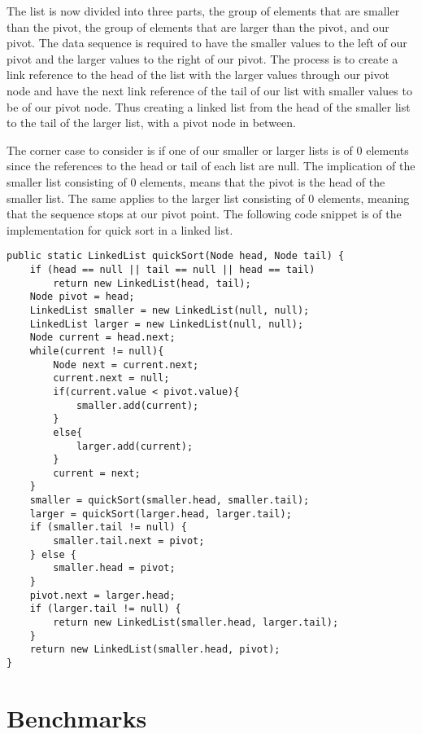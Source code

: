 \documentclass[a4paper,11pt]{article}
\begin{document}
        The list is now divided into three parts, the group of elements that are smaller than the pivot, the group of elements that are larger than the pivot, and our pivot. The data sequence is required to have the smaller values to the left of our pivot and the larger values to the right of our pivot. The process is to create a link reference to the head of the list with the larger values through our pivot node and have the next link reference of the tail of our list with smaller values to be of our pivot node. Thus creating a linked list from the head of the smaller list to the tail of the larger list, with a pivot node in between. 

        The corner case to consider is if one of our smaller or larger lists is of 0 elements since the references to the head or tail of each list are null. The implication of the smaller list consisting of 0 elements, means that the pivot is the head of the smaller list. The same applies to the larger list consisting of 0 elements, meaning that the sequence stops at our pivot point. The following code snippet is of the implementation for quick sort in a linked list.

\begin{verbatim}
public static LinkedList quickSort(Node head, Node tail) {
    if (head == null || tail == null || head == tail)
        return new LinkedList(head, tail);
    Node pivot = head;
    LinkedList smaller = new LinkedList(null, null);
    LinkedList larger = new LinkedList(null, null);
    Node current = head.next;
    while(current != null){
        Node next = current.next;
        current.next = null;
        if(current.value < pivot.value){
            smaller.add(current);
        }
        else{
            larger.add(current);
        }
        current = next;
    }
    smaller = quickSort(smaller.head, smaller.tail);
    larger = quickSort(larger.head, larger.tail);
    if (smaller.tail != null) {
        smaller.tail.next = pivot;
    } else {
        smaller.head = pivot;
    }
    pivot.next = larger.head;
    if (larger.tail != null) {
        return new LinkedList(smaller.head, larger.tail);
    }
    return new LinkedList(smaller.head, pivot);
}
\end{verbatim}

\section*{Benchmarks}
\end{document}
